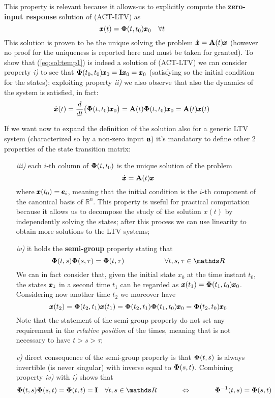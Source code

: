 	This property is relevant because it allows-us to explicitly compute the \textbf{zero-input response} solution of (ACT-LTV) as
	\begin{equation} \label{eq:sol:temp1}
		\pmb{x}(t) = \mathbf{\Phi}(t,t_0) \pmb{x}_0 \quad \forall t
	\end{equation}
	This solution is proven to be the unique solving the problem $\dot{\pmb{x}} = \mathbf{A}(t) \pmb{x}$ (however no proof for the uniqueness is reported here and must be taken for granted). To show that (\ref{eq:sol:temp1}) is indeed a solution of (ACT-LTV) we can consider property \textit{i)} to see that $\mathbf{\Phi}(t_0,t_0)\pmb{x}_0 = \mathbf{I} \pmb{x}_0 = \pmb{x}_0$ (satisfying so the initial condition for the states); exploiting property \textit{ii)} we also observe that also the dynamics of the system is satisfied, in fact:
	\[ \dot{\pmb{x}}(t) = \frac d{dt}\big(\mathbf{\Phi}(t,t_0) \pmb{x}_0\big) = \mathbf{A}(t) \mathbf{\Phi} (t,t_0)\pmb{x}_0 = \mathbf{A}(t)\pmb{x}(t) \] 
	
	If we want now to expand the definition of the solution also for a generic LTV system (characterized so by a non-zero input $\pmb{u}$) it's mandatory to define other 2 properties of the state transition matrix:
	\begin{itemize}
		\item[\textit{iii)}] each $i$-th column of $\mathbf{\Phi}(t,t_0)$ is the unique solution of the problem 
		\[ \dot{\pmb{x}} = \mathbf{A}(t)\pmb{x} \]
		where $\pmb{x}(t_0) = \pmb{e}_i$, meaning that the initial condition is the $i$-th component of the canonical basis of $\mathds R^n$. This property is useful for practical computation because it allows us to decompose the study of the solution $x(t)$ by independently solving the states; after this process we can use linearity to obtain more solutions to the LTV systems;
		
		\item[\textit{iv)}] it holds the \textbf{semi-group} property stating that
		\[ \stm(t,s) \stm(s,\tau) = \stm(t,\tau) \hspace{2cm} \forall t,s,\tau\in \mathds R \]
		We can in fact consider that, given the initial state $x_0$ at the time instant $t_0$, the states $\pmb{x}_1$ in a second time $t_1$ can be regarded as $\pmb{x}(t_1) = \mathbf{\Phi}(t_1,t_0)\pmb{x}_0$. Considering now another time $t_2$ we moreover have
		\[ \pmb{x}(t_2) = \mathbf{\Phi}(t_2,t_1) \pmb{x}(t_1) = \mathbf{\Phi}(t_2,t_1) \mathbf{\Phi}(t_1,t_0) \pmb{x}_0 = \mathbf{\Phi}(t_2,t_0) \pmb{x}_0 \]
		Note that the statement of the semi-group  property do not set any requirement in the \textit{relative position} of the times, meaning that is not necessary to have $t>s>\tau$;
		
		\item[\textit{v)}] direct consequence of the semi-group property is that $\mathbf{\Phi}(t,s)$ is always invertible (is never singular) with inverse equal to $\mathbf{\Phi}(s,t)$. Combining property \textit{iv)} with \textit{i)} shows that
		\[ \stm(t,s) \stm(s,t) = \stm(t,t) = \I \quad \forall t,s \in \mathds R \hspace{1.2cm} \Leftrightarrow \hspace{1.2cm} \stm^{-1}(t,s) = \stm(s,t) \]
	\end{itemize}


